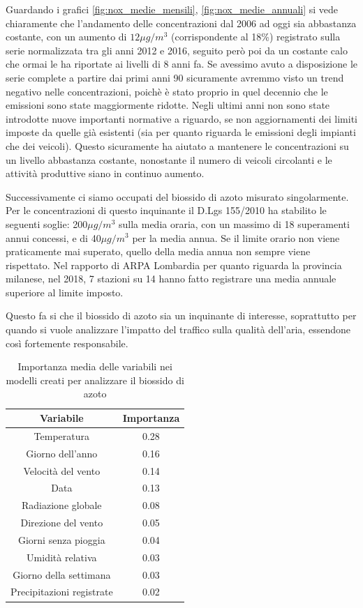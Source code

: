 \documentclass[a4paper]{report}
\begin{document}
Guardando
i grafici \ref{fig:nox_medie_mensili}, \ref{fig:nox_medie_annuali} si vede chiaramente che l'andamento delle concentrazioni dal 2006 ad oggi sia abbastanza costante, con un aumento di $12\mu g/m^3$ (corrispondente al 18\%) registrato sulla serie normalizzata tra gli anni 2012 e 2016, seguito però poi da un costante calo che ormai le ha riportate ai livelli di 8 anni fa. Se avessimo avuto a disposizione le serie complete a partire dai primi anni 90 sicuramente avremmo visto un trend negativo nelle concentrazioni, poichè è stato proprio in quel decennio che le emissioni sono state maggiormente ridotte. Negli ultimi anni non sono state introdotte nuove importanti normative a riguardo, se non aggiornamenti dei limiti imposte da quelle già esistenti (sia per quanto riguarda le emissioni degli impianti che dei veicoli). Questo sicuramente ha aiutato a mantenere le concentrazioni su un livello abbastanza costante, nonostante il numero di veicoli circolanti e le attività produttive siano in continuo aumento.

Successivamente ci siamo occupati del biossido di azoto misurato singolarmente. Per le concentrazioni di questo inquinante il D.Lgs 155/2010 ha stabilito le seguenti soglie: 200$\mu g/m^3$ sulla media oraria, con un massimo di 18 superamenti annui concessi, e di 40$\mu g/m^3$ per la media annua. Se il limite orario non viene praticamente mai superato, quello della media annua non sempre viene rispettato. Nel rapporto di ARPA Lombardia \cite{arpa2018rapporto} per quanto riguarda la provincia milanese, nel 2018, 7 stazioni su 14 hanno fatto registrare una media annuale superiore al limite imposto.

Questo fa si che il biossido di azoto sia un inquinante di interesse, soprattutto per quando si vuole analizzare l'impatto del traffico sulla qualità dell'aria, essendone così fortemente responsabile.

\begin{table}[h!]
\centering
\begin{tabular}{ |c c| }
	\hline
	Variabile & Importanza \\
	\hline
	Temperatura & 0.28 \\
	Giorno dell'anno & 0.16 \\
	Velocità del vento & 0.14 \\
	Data & 0.13 \\
	Radiazione globale & 0.08 \\
	Direzione del vento & 0.05 \\
	Giorni senza pioggia & 0.04 \\
	Umidità relativa & 0.03 \\
	Giorno della settimana & 0.03 \\
	Precipitazioni registrate & 0.02 \\
	\hline
\end{tabular}
\caption{Importanza media delle variabili nei modelli creati per analizzare il biossido di azoto}
\label{table:importanza_no2}
\end{table}
\end{document}
